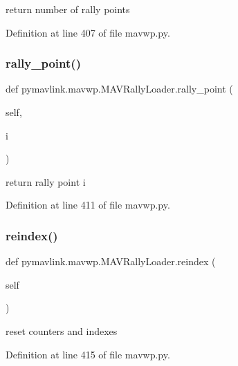 \begin{DoxyVerb}return number of rally points\end{DoxyVerb}
 

Definition at line 407 of file mavwp.\+py.

\mbox{\label{classpymavlink_1_1mavwp_1_1MAVRallyLoader_a734094aad4618eef743ee42b33495537}} 
\subsubsection{\texorpdfstring{rally\_point()}{rally\_point()}}
{\footnotesize\ttfamily def pymavlink.\+mavwp.\+M\+A\+V\+Rally\+Loader.\+rally\+\_\+point (\begin{DoxyParamCaption}\item[{}]{self,  }\item[{}]{i }\end{DoxyParamCaption})}

\begin{DoxyVerb}return rally point i\end{DoxyVerb}
 

Definition at line 411 of file mavwp.\+py.

\mbox{\label{classpymavlink_1_1mavwp_1_1MAVRallyLoader_a727649ff011c06cb84d8dd9bce24f30e}} 
\subsubsection{\texorpdfstring{reindex()}{reindex()}}
{\footnotesize\ttfamily def pymavlink.\+mavwp.\+M\+A\+V\+Rally\+Loader.\+reindex (\begin{DoxyParamCaption}\item[{}]{self }\end{DoxyParamCaption})}

\begin{DoxyVerb}reset counters and indexes\end{DoxyVerb}
 

Definition at line 415 of file mavwp.\+py.

